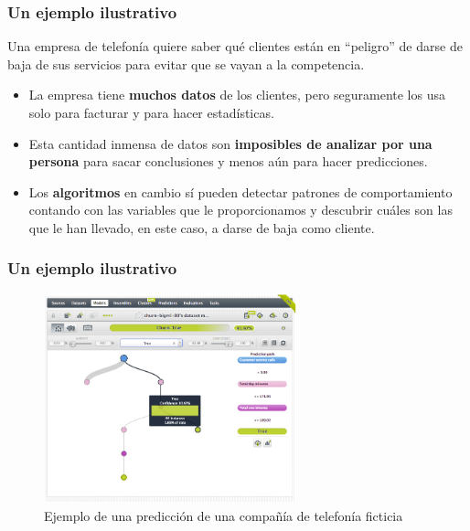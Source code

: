 \documentclass[9pt]{beamer} %
\begin{document}
		\begin{frame}
	\frametitle{Un ejemplo ilustrativo}
	\begin{shaded}
	Una empresa de telefonía quiere saber qué clientes están en “peligro” de darse de baja de sus servicios para evitar que se vayan a la competencia.
	\begin{itemize}
	    \item La empresa tiene \textbf{muchos datos} de los clientes, pero seguramente los usa solo para facturar y para hacer estadísticas.
	    \item Esta cantidad inmensa de datos son \textbf{imposibles de analizar por una persona} para sacar conclusiones y menos aún para hacer predicciones.
	    \item Los \textbf{algoritmos} en cambio sí pueden detectar patrones de comportamiento contando con las variables que le proporcionamos y descubrir cuáles son las que le han llevado, en este caso, a darse de baja como cliente.
	\end{itemize}
	\end{shaded}
	\end{frame}
	
	    \begin{frame}
	\frametitle{Un ejemplo ilustrativo}
	\begin{figure}[H]
    \centering
    \includegraphics[width=0.650\textwidth]{ejemploMachineLearning.png}
    \caption{Ejemplo de una predicción de una compañía de telefonía ficticia}
    \end{figure}
	
	\end{frame}
	
\end{document}
